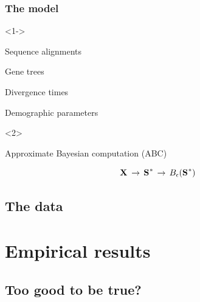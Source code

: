 \begin{frame}[t]
    \frametitle{The \msb model}
        \begin{onlyenv}<1->
        \smallskip
        \begin{mydescription}
            \item[\alignmentVector] Sequence alignments
            \item[\geneTreeVector] Gene trees
            \item[\divTimeMapVector] Divergence times
            \item[\demographicParamVector] Demographic parameters
        \end{mydescription}
        \end{onlyenv}
    \begin{onlyenv}<2>
    \smallskip
        \centerline{Approximate Bayesian computation (ABC)}
        \[ \alignmentVector \, \to \, \ssVectorObs \, \to \, \ssSpace\]
    \end{onlyenv}
\end{frame}


\subsection{The data}


\section{Empirical results}
\subsection{Too good to be true?}

